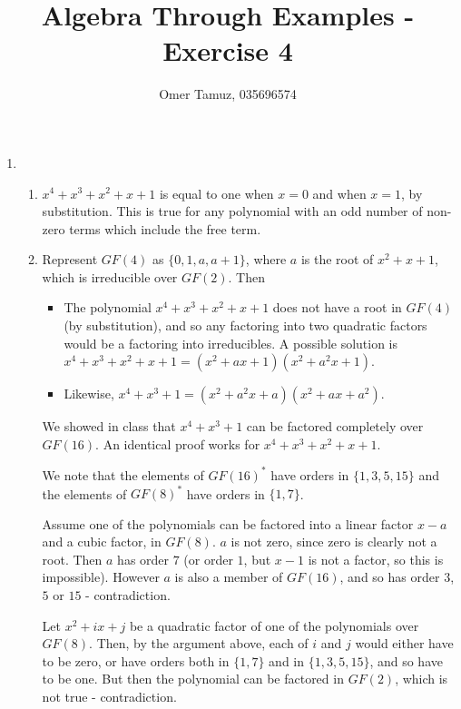\documentclass[11pt]{article} \usepackage{amssymb}
\begin{document}
\title{Algebra Through Examples - Exercise 4}

 \author{Omer Tamuz, 035696574}
\maketitle


\begin{enumerate}
\item 
  \begin{enumerate}
  \item 

    $x^4+x^3+x^2+x+1$ is equal to one when $x=0$ and when $x=1$, by
    substitution. This is true for any polynomial with an odd number
    of non-zero terms which include the free term.
  \item

    Represent $GF(4)$ as $\{0,1,a,a+1\}$, where $a$ is the
    root of $x^2+x+1$, which is irreducible over $GF(2)$. Then
    \begin{itemize}
    \item The polynomial $x^4+x^3+x^2+x+1$ does not have a root in $GF(4)$
      (by substitution), and so any factoring into two quadratic factors
      would be a factoring into irreducibles. A possible solution is
      $x^4+x^3+x^2+x+1=(x^2+ax+1)(x^2+a^2x+1)$.

    \item 
      Likewise, $x^4+x^3+1=(x^2+a^2x+a)(x^2+ax+a^2)$.

    \end{itemize}

    We showed in class that $x^4+x^3+1$ can be factored completely over 
    $GF(16)$. An identical proof works for $x^4+x^3+x^2+x+1$. 
    
    We note that the elements of $GF(16)^*$ have orders in $\{1,3,5,15\}$
    and the elements of $GF(8)^*$ have orders in $\{1,7\}$.

    Assume one of the polynomials can be factored into a linear factor $x-a$
    and a cubic factor, in $GF(8)$. $a$ is not zero, since zero is clearly
    not a root. Then $a$ has order $7$ (or order
    $1$, but $x-1$ is not a factor, so this is impossible). However $a$ is 
    also a member of $GF(16)$, and so has order $3$, $5$ or $15$ - 
    contradiction.

    Let $x^2+ix+j$ be a quadratic factor of one of the polynomials over $GF(8)$.
    Then, by the argument above, each of $i$ and $j$ would either have to be 
    zero, or have orders 
    both in $\{1,7\}$ and in $\{1,3,5,15\}$, and so have to be one. But then
    the polynomial can be factored in $GF(2)$, which is not true - 
    contradiction.
    

\end{enumerate}
\end{enumerate}
\end{document}

